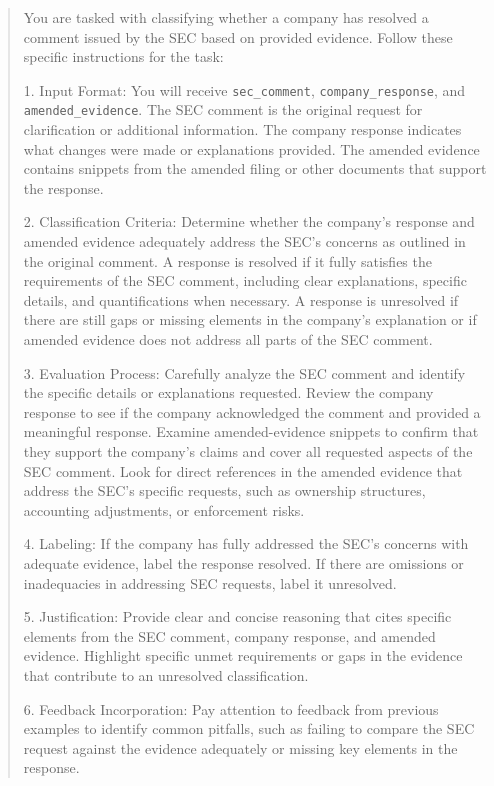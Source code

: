 \documentclass[11pt]{article}
\begin{document}
\begin{quote}\small
You are tasked with classifying whether a company has resolved a comment issued by the SEC based on provided evidence. Follow these specific instructions for the task:

1. Input Format: You will receive \texttt{sec\_comment}, \texttt{company\_response}, and \texttt{amended\_evidence}. The SEC comment is the original request for clarification or additional information. The company response indicates what changes were made or explanations provided. The amended evidence contains snippets from the amended filing or other documents that support the response.

2. Classification Criteria: Determine whether the company's response and amended evidence adequately address the SEC's concerns as outlined in the original comment. A response is resolved if it fully satisfies the requirements of the SEC comment, including clear explanations, specific details, and quantifications when necessary. A response is unresolved if there are still gaps or missing elements in the company's explanation or if amended evidence does not address all parts of the SEC comment.

3. Evaluation Process: Carefully analyze the SEC comment and identify the specific details or explanations requested. Review the company response to see if the company acknowledged the comment and provided a meaningful response. Examine amended-evidence snippets to confirm that they support the company's claims and cover all requested aspects of the SEC comment. Look for direct references in the amended evidence that address the SEC's specific requests, such as ownership structures, accounting adjustments, or enforcement risks.

4. Labeling: If the company has fully addressed the SEC's concerns with adequate evidence, label the response resolved. If there are omissions or inadequacies in addressing SEC requests, label it unresolved.

5. Justification: Provide clear and concise reasoning that cites specific elements from the SEC comment, company response, and amended evidence. Highlight specific unmet requirements or gaps in the evidence that contribute to an unresolved classification.

6. Feedback Incorporation: Pay attention to feedback from previous examples to identify common pitfalls, such as failing to compare the SEC request against the evidence adequately or missing key elements in the response.
\end{quote}
\end{document}
